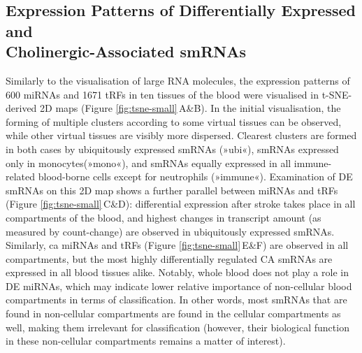 \subsection{Expression Patterns of Differentially Expressed and\\ Cholinergic-Associated smRNAs}
Similarly to the visualisation of large RNA molecules, the expression patterns of 600 miRNAs and 1671 tRFs in ten tissues of the blood were visualised in t-SNE-derived 2D maps (Figure \ref{fig:tsne-small}\,A\&B). In the initial visualisation, the forming of multiple clusters according to some virtual tissues can be observed, while other virtual tissues are visibly more dispersed. Clearest clusters are formed in both cases by ubiquitously expressed smRNAs (»ubi«), smRNAs expressed only in monocytes(»mono«), and smRNAs equally expressed in all immune-related blood-borne cells except for neutrophils (»immune«). Examination of DE smRNAs on this 2D map shows a further parallel between miRNAs and tRFs (Figure \ref{fig:tsne-small}\,C\&D): differential expression after stroke takes place in all compartments of the blood, and highest changes in transcript amount (as measured by count-change) are observed in ubiquitously expressed smRNAs. Similarly, \acf{ca} miRNAs and tRFs (Figure \ref{fig:tsne-small}\,E\&F) are observed in all compartments, but the most highly differentially regulated CA smRNAs are expressed in all blood tissues alike. Notably, whole blood does not play a role in DE miRNAs, which may indicate lower relative importance of non-cellular blood compartments in terms of classification. In other words, most smRNAs that are found in non-cellular compartments are found in the cellular compartments as well, making them irrelevant for classification (however, their biological function in these non-cellular compartments remains a matter of interest).


